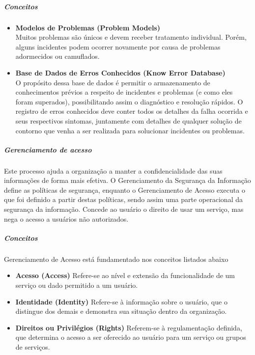 \documentclass[11pt,a4paper]{article}
\begin{document}
\subparagraph*{Conceitos}
\begin{itemize}[noitemsep]
	\item {\bfseries Modelos de Problemas (Problem Models)} \\
		Muitos problemas são únicos e devem receber tratamento individual. Porém, alguns incidentes 				podem ocorrer novamente por causa de problemas adormecidos ou camuflados.
	\item {\bfseries Base de Dados de Erros Conhecidos (Know Error Database) } \\
		O propósito dessa base de dados é permitir o armazenamento de conhecimentos prévios a
	respeito de incidentes e problemas (e como eles foram superados), possibilitando assim o
	diagnóstico e resolução rápidos. O registro de erros conhecidos deve conter todos os detalhes da 		falha ocorrida e seus respectivos sintomas, juntamente com detalhes de qualquer solução de contorno 		que venha a ser realizada para solucionar incidentes ou problemas.
\end{itemize}





\subparagraph{Gerenciamento de acesso}

Este processo ajuda a organização a manter a confidencialidade das suas informações de
forma mais efetiva. O Gerenciamento da Segurança da Informação define as políticas de
segurança, enquanto o Gerenciamento de Acesso executa o que foi definido a partir destas
políticas, sendo assim uma parte operacional da segurança da informação.
Concede ao usuário o direito de usar um serviço, mas nega o acesso a usuários não autorizados.

\subparagraph*{Conceitos}
Gerenciamento de Acesso está fundamentado nos conceitos listados abaixo
\begin{itemize}[noitemsep]
	\item {\bfseries Acesso (Access) }
		Refere-se ao nível e extensão da funcionalidade de um serviço ou dado permitido a um usuário.
	\item {\bfseries Identidade (Identity) }
		Refere-se à informação sobre o usuário, que o distingue dos demais e demonstra sua situação 				dentro da organização.
	\item {\bfseries  Direitos ou Privilégios (Rights) }
		Referem-se à regulamentação definida, que determina o acesso a ser oferecido ao usuário
		para um serviço ou grupos de serviços.
\end{itemize}
\end{document}
